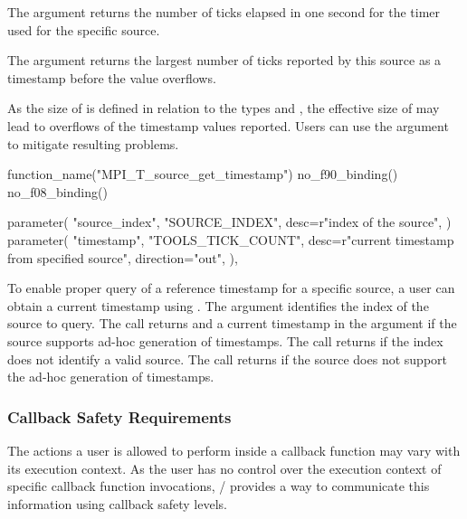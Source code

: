 The  argument returns the number of ticks elapsed in
one second for the timer used for the specific source.

The  argument returns the largest number of ticks
reported by this source as a timestamp before the value overflows.

\begin{users}
    As the size of  is defined in relation to the types
     and , the effective size of
     may lead to overflows of the timestamp values
    reported.  Users can use the argument  to
    mitigate resulting problems.
\end{users}



\begin{mpi-binding}
    function_name("MPI_T_source_get_timestamp")
    no_f90_binding()
    no_f08_binding()

    parameter(
        "source_index",
        "SOURCE_INDEX",
        desc=r"index of the source",
    )
    parameter(
        "timestamp",
        "TOOLS_TICK_COUNT",
        desc=r"current timestamp from specified source",
        direction="out",
    ),
\end{mpi-binding}

To enable proper query of a reference timestamp for a specific source, a
user can obtain a current timestamp using
.  The argument
 identifies the index of the source to query.  The
call returns  and a current timestamp in the argument
 if the source supports ad-hoc generation of timestamps.
The call returns  if the index does not
identify a valid source.  The call returns
 if the source does not support the
ad-hoc generation of timestamps.


\subsubsection{Callback Safety Requirements}

The actions a user is allowed to perform inside a callback function may vary
with its execution context.  As the user has no control over the execution
context of specific callback function invocations, \MPI/ provides a way to
communicate this information using callback safety levels.

